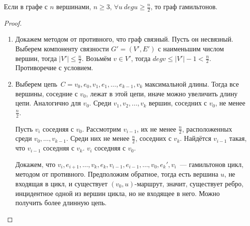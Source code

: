 \begin{theorem}[Дирака]
Если в графе с $n$ вершинами, $n \geqslant 3$, $\forall u \ deg u \geqslant \frac{n}2$, то граф гамильтонов.
\end{theorem}
\begin{proof}
\begin{enumerate}
	\item Докажем методом от противного, что граф связный. Пусть он несвязный. Выберем компоненту
	связности $G' = (V', E')$ с наименьшим числом вершин, тогда $|V'| \leqslant \frac{n}2$.
	Возьмём $v \in V'$, тогда $deg v \leqslant |V'| - 1 < \frac{n}2$. Противоречие с условием.
	\item Выберем цепь~$C = v_0, e_0, v_1, e_1, \ldots, e_{k-1}, v_k$ максимальной длины. Тогда все вершины, соседние с $v_0$, лежат в этой цепи, иначе можно увеличить длину цепи. Аналогично для $v_0$. Среди $v_1, v_2, \ldots, v_k$ вершин, соседних с $v_0$, не менее $\frac{n}2$.
	
	Пусть $v_i$ соседняя с $v_0$. Рассмотрим $v_{i-1}$, их не менее $\frac{n}2$, расположенных среди $v_0, \ldots, v_{k-1}$. Среди них не менее $\frac{n}2$, соседних с $v_k$. Найдётся $v_{i-1}$ такая, что $v_{i-1}$ соседняя с $v_k$. $v_i$ соседняя с $v_0$.
	
	Докажем, что $v_i, e_{i+1}, \ldots, v_k, e_k, v_{i-1}, e_{i-1}, \ldots, v_0, e_k', v_i$~---
	гамильтонов цикл, методом от противного. Предположим обратное, тогда есть вершина $u$, не входящая в цикл, и существует $(v_0, u)$-маршрут, значит, существует ребро, инцидентное одной из вершин цикла, но не входящее в него. Можно получить более длинную цепь.
\end{enumerate}
\end{proof}

